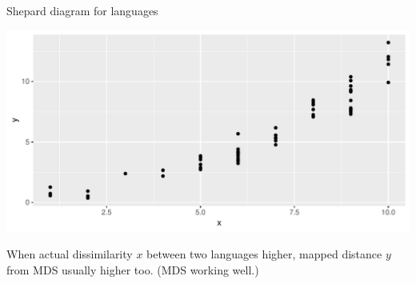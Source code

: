 \begin{frame}[fragile]{Shepard diagram for languages}
  
\begin{knitrout}
\color{fgcolor}\begin{kframe}
\begin{alltt}
\hlkwb{=}\hlopt{$}
\hlstd{(}\hlstd{(}\hlopt{+}\hlstd{()}
\end{alltt}
\end{kframe}
\includegraphics[width=\maxwidth]{figure/parma-1} 

\end{knitrout}
When actual dissimilarity $x$ between two languages higher, mapped
distance $y$ from MDS usually higher too. (MDS working well.)
  
\end{frame}

